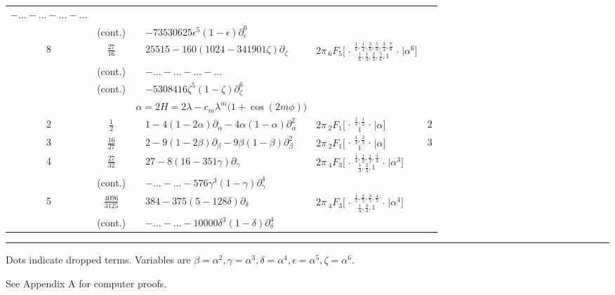 \documentclass[nofootinbib,preprint]{revtex4-1}
\begin{document}
\begin{table}[t]
\begin{center}
{\begin{tabularx}{\textwidth}{ c | c | c l | c l | c }
$-\ldots - \ldots - \ldots - \ldots $
  & & &     \\
 & \tiny(cont.)  & & \hspace{1.0cm}
$ - 73530625 \epsilon^5 (1 - \epsilon)\partial_{\epsilon}^6 $
  & & &     \\
8 & $\frac{27}{16}$  & &
 $25515 -160 (1024 - 341901 \zeta)\partial_{\zeta} $ & &
$2\pi\,_6F_5 \Big[ \genfrac..{0pt}{}{
\frac{1}{8},\frac{1}{4},\frac{3}{8},\frac{5}{8},\frac{3}{4},\frac{7}{8}
}{\frac{1}{6},\frac{1}{3},\frac{2}{3},\frac{5}{6},1}\Big| \alpha^6 \Big]$     \\
 & \tiny(cont.)  & & \hspace{0.5cm}
$-\ldots - \ldots - \ldots - \ldots  $
  & & &     \\
 & \tiny(cont.)  & & \hspace{1.0cm}
$ - 5308416\zeta^5 (1 - \zeta)\partial_{\zeta}^6 $
  & & &     \\ \hline 
\multicolumn{7}{c}{$\alpha = 2H = 2\lambda - c_m \lambda^{m}\big(1+\cos(2m\phi)\big) $ } \\  
\hline
2 & $\frac{1}{2}$  & &
$1 - 4 (1 - 2 \alpha)\partial_{\alpha}- 4  \alpha(1 - \alpha)\partial_{\alpha}^2$   & &
$2\pi\,_2F_1 \Big[ \genfrac..{0pt}{}{
\frac{1}{2},\frac{1}{2}
}{1}\Big| \alpha \Big]$  & $2$    \\
3 & $\frac{16}{27}$  & &
$2 - 9 (1 - 2 \beta)\partial_{\beta}- 9  \beta(1 - \beta)\partial_{\beta}^2$   & &
$2\pi\,_2F_1 \Big[ \genfrac..{0pt}{}{
\frac{1}{3},\frac{2}{3}
}{1}\Big| \alpha  \Big]$  & $3$   \\
4 & $\frac{27}{32}$  & &
$27 - 8 (16 - 351 \gamma)\partial_{\gamma}$ 
  & &
$2\pi\,_4F_3 \Big[ \genfrac..{0pt}{}{
\frac{1}{4},\frac{1}{2},\frac{1}{2},\frac{3}{4}
}{\frac{1}{3},\frac{2}{3},1}\Big| \alpha^3 \Big]$ &     \\
 & \tiny(cont.)  & & \hspace{0.5cm}
$-\ldots - \ldots - 576 \gamma^3 (1 - \gamma) \partial_{\gamma}^4 $
  & & &     \\
5 & $\frac{4096}{3125}$  & &
$384 - 375 (5 - 128 \delta)\partial_{\delta}$ 
  & &
$2\pi\,_4F_3 \Big[ \genfrac..{0pt}{}{
\frac{1}{5},\frac{2}{5},\frac{3}{5},\frac{4}{5}
}{\frac{1}{4},\frac{3}{4},1}\Big| \alpha^4 \Big]$ &     \\
 & \tiny(cont.)  & & \hspace{0.5cm}
$-\ldots - \ldots - 10000 \delta^3 (1 - \delta) \partial_{\delta}^4 $
  & & &     \\
\end{tabularx}}
\rule{\textwidth}{.01cm}
Dots indicate dropped terms. Variables are 
$\beta=\alpha^2, \gamma=\alpha^3, \delta=\alpha^4, 
\epsilon=\alpha^5, \zeta=\alpha^6$. 

See Appendix A for computer proofs.
\end{center}
\end{table}
\end{document}
